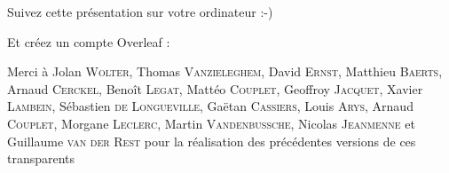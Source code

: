\begin{frame}
  \begin{center}\Large
  Suivez cette présentation sur votre ordinateur :-)

  \vspace{1cm}


  \vspace{1cm}

  Et créez un compte Overleaf :

  \vspace{1cm}

  \end{center}
\end{frame}


\begin{frame}
  \maketitle
  Merci à Jolan \textsc{Wolter}, Thomas \textsc{Vanzieleghem}, David \textsc{Ernst}, Matthieu \textsc{Baerts}, Arnaud \textsc{Cerckel}, Benoît \textsc{Legat}, Mattéo \textsc{Couplet}, Geoffroy \textsc{Jacquet}, Xavier \textsc{Lambein}, Sébastien \textsc{de Longueville}, Gaëtan \textsc{Cassiers}, Louis \textsc{Arys}, Arnaud \textsc{Couplet}, Morgane \textsc{Leclerc},  Martin \textsc{Vandenbussche}, Nicolas \textsc{Jeanmenne} et Guillaume \textsc{van der Rest} pour la réalisation des précédentes versions de ces transparents
\end{frame}
